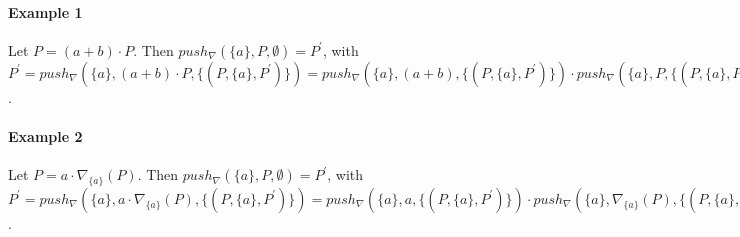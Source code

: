 \documentclass{article}
\begin{document}
\paragraph{Example 1}

Let $P=(a+b)\cdot P$. Then $push_{\nabla }\left( \{a\},P,\emptyset \right)
=P^{\prime }$, with $P^{\prime }=push_{\nabla }\left( \{a\},(a+b)\cdot
P,\{(P,\{a\},P^{\prime })\}\right) =push_{\nabla }\left(
\{a\},(a+b),\{(P,\{a\},P^{\prime })\}\right) \cdot push_{\nabla }\left(
\{a\},P,\{(P,\{a\},P^{\prime })\}\right) =\cdots =a\cdot P^{\prime }$.

\paragraph{Example 2}

Let $P=a\cdot \nabla _{\{a\}}(P)$. Then $push_{\nabla }\left(
\{a\},P,\emptyset \right) =P^{\prime }$, with $P^{\prime }=push_{\nabla
}\left( \{a\},a\cdot \nabla _{\{a\}}(P),\{(P,\{a\},P^{\prime })\}\right)
=push_{\nabla }\left( \{a\},a,\{(P,\{a\},P^{\prime })\}\right) \cdot
push_{\nabla }\left( \{a\},\nabla _{\{a\}}(P),\{(P,\{a\},P^{\prime
})\}\right) =\cdots =a\cdot P^{\prime }$.
\end{document}
